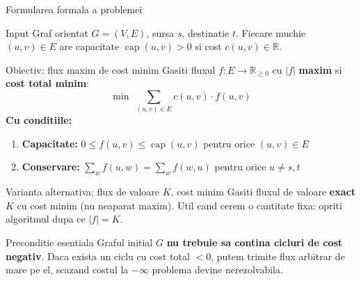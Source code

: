 ﻿\documentclass[9pt]{beamer}
\newcommand{\capop}{\operatorname{cap}}
\begin{document}
\begin{frame}[shrink]{Formularea formala a problemei}
  \begin{block}{Input}
    Graf orientat $G=(V,E)$, sursa $s$, destinatie $t$.
    Fiecare muchie $(u,v)\in E$ are capacitate $\capop(u,v)>0$ si cost $c(u,v)\in\mathbb{R}$.
  \end{block}
  \begin{block}{Obiectiv: flux maxim de cost minim}
    Gasiti fluxul $f:E\to\mathbb{R}_{\geq 0}$ cu $|f|$ \textbf{maxim} si \textbf{cost total minim}:
    \[
      \min \;\sum_{(u,v)\in E} c(u,v)\cdot f(u,v)
    \]
    \textbf{Cu conditiile:}
    \begin{enumerate}\footnotesize
      \item \textbf{Capacitate:} $0\leq f(u,v)\leq\capop(u,v)$ pentru orice $(u,v)\in E$
      \item \textbf{Conservare:} $\sum_w f(u,w)=\sum_w f(w,u)$ pentru orice $u\neq s,t$
    \end{enumerate}
  \end{block}
  \begin{alertblock}{Varianta alternativa: flux de valoare $K$, cost minim}
    Gasiti fluxul de valoare \textbf{exact} $K$ cu cost minim (nu neaparat maxim).
    Util cand cerem o cantitate fixa: opriti algoritmul dupa ce $|f|=K$.
  \end{alertblock}
  \begin{block}{\alert{Preconditie esentiala}}
    \footnotesize
    Graful initial $G$ \textbf{nu trebuie sa contina cicluri de cost negativ}.
    Daca exista un ciclu cu cost total $<0$, putem trimite flux arbitrar de mare pe el,
    scazand costul la $-\infty$ \textemdash{} problema devine nerezolvabila.
  \end{block}
\end{frame}
\end{document}
